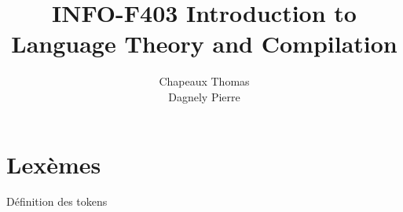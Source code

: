 \documentclass[a4paper,10pt]{article}
\title{INFO-F403 Introduction to Language Theory and Compilation}
\author{Chapeaux Thomas\\Dagnely Pierre}
\begin{document}
\maketitle


\pagebreak

\section{Lexèmes}

Définition des tokens~\\
\end{document}
